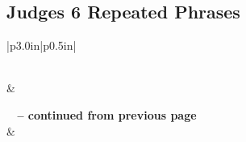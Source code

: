\subsection{Judges 6 Repeated Phrases}


\normalsize
 
\begin{center}
\begin{longtable}{|p{3.0in}|p{0.5in}|}
\caption[Judges 6 Repeated Phrases]{Judges 6 Repeated Phrases}\label{table:Repeated Phrases Judges 6} \\
\hline {} &  \\ \hline 
\endfirsthead
 
{{\bfseries \tablename\ \thetable{} -- continued from previous page}} \\  
\hline {} &  \\ \hline 
\endhead
 

\end{longtable}
\end{center}
